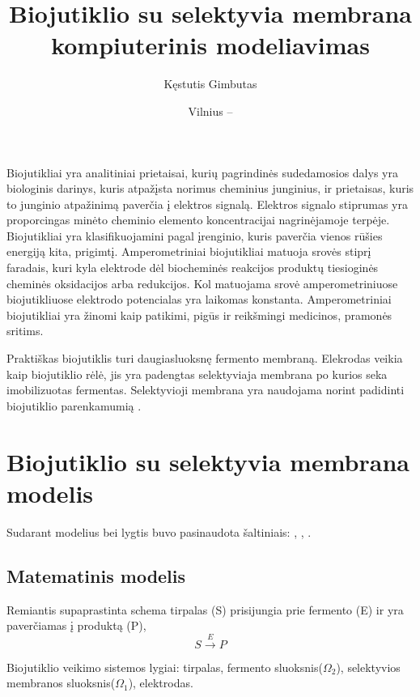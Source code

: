 \documentclass[12pt, a4paper, lithuanian]{article}
\title{Biojutiklio su selektyvia membrana kompiuterinis modeliavimas}
\author{
   Kęstutis Gimbutas
}
\date{Vilnius – \the\year}
\begin{document}
\sloppy
\maketitle

\tableofcontents

Biojutikliai yra analitiniai prietaisai, kurių pagrindinės sudedamosios dalys
yra biologinis darinys, kuris atpažįsta norimus cheminius junginius, ir
prietaisas, kuris to junginio atpažinimą  paverčia į elektros signalą. Elektros
signalo stiprumas yra proporcingas minėto cheminio elemento koncentracijai
nagrinėjamoje terpėje. Biojutikliai yra klasifikuojamini pagal įrenginio, kuris
paverčia vienos rūšies energiją kita,
prigimtį. Amperometriniai biojutikliai matuoja srovės stiprį faradais, kuri
kyla elektrode dėl biocheminės reakcijos produktų tiesioginės cheminės oksidacijos 
arba redukcijos. Kol matuojama srovė amperometriniuose biojutikliuose elektrodo potencialas yra
laikomas konstanta. Amperometriniai biojutikliai yra žinomi
kaip patikimi, pigūs ir reikšmingi medicinos, pramonės sritims.

Praktiškas biojutiklis turi daugiasluoksnę fermento membraną. Elekrodas veikia
kaip biojutiklio rėlė, jis yra padengtas selektyviaja membrana po kurios seka
imobilizuotas fermentas. Selektyvioji membrana yra naudojama norint padidinti
biojutiklio parenkamumią \cite{baronas2006computational}. \\

\section{Biojutiklio su selektyvia membrana modelis}
Sudarant modelius bei lygtis buvo pasinaudota šaltiniais:
\cite{baronas2009mathematical}, \cite{baronas2006computational},
\cite{baronas2003influence}.

\subsection{Matematinis modelis}
Remiantis supaprastinta schema tirpalas (S) prisijungia prie fermento (E)
ir yra
paverčiamas į produktą (P),
\begin{equation}\label{eq:basic} 
    S \overset{E}{\rightarrow} P
\end{equation}

Biojutiklio veikimo sistemos lygiai: tirpalas, fermento sluoksnis($\Omega_2$),
selektyvios
membranos sluoksnis($\Omega_1$), elektrodas.
\end{document}
